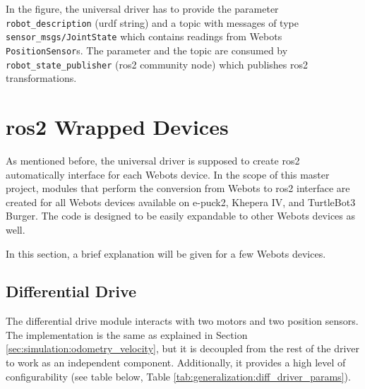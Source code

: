 In the figure, the universal driver has to provide the parameter \texttt{robot\_description} (\ac{urdf} string) and a topic with messages of type \texttt{sensor\_msgs/JointState} which contains readings from Webots \texttt{PositionSensor}s.
The parameter and the topic are consumed by \texttt{robot\_state\_publisher} (\ac{ros2} community node) which publishes \ac{ros2} transformations.

\section{\ac{ros2} Wrapped Devices}
As mentioned before, the universal driver is supposed to create \ac{ros2} automatically interface for each Webots device.
In the scope of this master project, modules that perform the conversion from Webots to \ac{ros2} interface are created for all Webots devices available on e-puck2, Khepera IV, and TurtleBot3 Burger.
The code is designed to be easily expandable to other Webots devices as well.

In this section, a brief explanation will be given for a few Webots devices.

\subsection{Differential Drive}
The differential drive module interacts with two motors and two position sensors.
The implementation is the same as explained in Section \ref{sec:simulation:odometry_velocity}, but it is decoupled from the rest of the driver to work as an independent component.
Additionally, it provides a high level of configurability (see table below, Table \ref{tab:generalization:diff_driver_params}).

